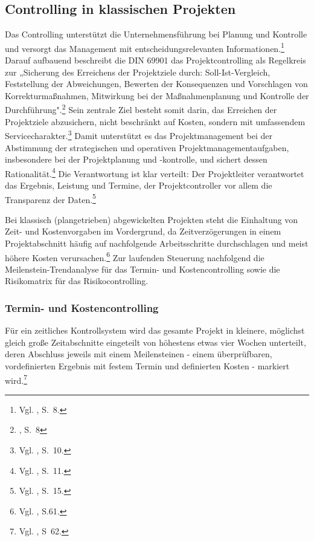 \documentclass[
    12pt, 
    a4paper,
    ]{scrartcl} %
\begin{document}
\subsection{Controlling in klassischen Projekten}
Das Controlling unterstützt die Unternehmensführung bei Planung und Kontrolle und versorgt das Management mit entscheidungsrelevanten Informationen.\footnote{Vgl. \cite{Feidler_ControllingVonProjekten}, S.~8.} Darauf aufbauend beschreibt die DIN 69901 das Projektcontrolling als Regelkreis zur „Sicherung des Erreichens der Projektziele durch: Soll-Ist-Vergleich, Feststellung der Abweichungen, Bewerten der Konsequenzen und Vorschlagen von Korrekturmaßnahmen, Mitwirkung bei der Maßnahmenplanung und Kontrolle der Durchführung".\footnote{\cite{Feidler_ControllingVonProjekten}, S.~8} Sein zentrale Ziel besteht somit darin, das Erreichen der Projektziele abzusichern, nicht beschränkt auf Kosten, sondern mit umfassendem Servicecharakter.\footnote{Vgl. \cite{Feidler_ControllingVonProjekten}, S.~10.} Damit unterstützt es das Projektmanagement bei der Abstimmung der strategischen und operativen Projektmanagementaufgaben, insbesondere bei der Projektplanung und -kontrolle, und sichert dessen Rationalität.\footnote{Vgl. \cite{Feidler_ControllingVonProjekten}, S.~11.} Die Verantwortung ist klar verteilt: Der Projektleiter verantwortet das Ergebnis, Leistung und Termine, der Projektcontroller vor allem die Transparenz der Daten.\footnote{Vgl. \cite{Feidler_ControllingVonProjekten}, S.~15.}

Bei klassisch (plangetrieben) abgewickelten Projekten steht die Einhaltung von Zeit- und Kostenvorgaben im Vordergrund, da Zeitverzögerungen in einem Projektabschnitt häufig auf nachfolgende Arbeitsschritte durchschlagen und meist höhere Kosten verursachen.\footnote{Vgl. \cite{Nobach_Projektcontrolling}, S.61.} Zur laufenden Steuerung nachfolgend die Meilenstein-Trendanalyse für das Termin- und Kostencontrolling sowie die Risikomatrix für das Risikocontrolling.

\subsubsection{Termin- und Kostencontrolling}
Für ein zeitliches Kontrollsystem wird das gesamte Projekt in kleinere, möglichst gleich große Zeitabschnitte eingeteilt von höhestens etwas vier Wochen unterteilt, deren Abschluss jeweils mit einem Meilensteinen - einem überprüfbaren, vordefinierten Ergebnis mit festem Termin und definierten Kosten - markiert wird.\footnote{Vgl. \cite{Nobach_Projektcontrolling}, S~62.}
\end{document}

